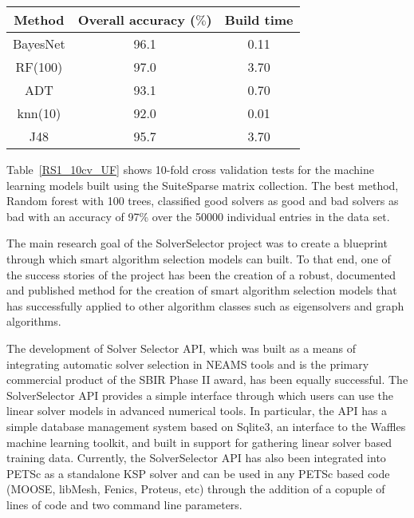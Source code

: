 \begin{table*}[h]
\centering
\caption{Convergence model accuracy and build time for 10-fold cross validation with SuiteSparse data set.}
\label{RS1_10cv_UF}
\begin{tabular}{|c|c|c|}    \hline  

Method                & Overall accuracy ($\%$)  & Build time \\ \hline\hline
BayesNet              &	96.1                    & 0.11	\\ \hline	    
RF(100)   &           97.0                    & 3.70	\\ \hline      
ADT                              &  93.1	                & 0.70	\\ \hline  
knn(10)                             &	92.0                    & 0.01	\\ \hline	    
J48                           &	95.7                    & 3.70	\\ \hline 	    
\end{tabular}
\end{table*}

Table~\ref{RS1_10cv_UF} shows 10-fold cross validation tests for the machine learning models built using the SuiteSparse matrix collection. The best method, Random forest with 100 trees, classified good solvers as good and bad solvers as bad with an accuracy of 97\% over the 50000 individual entries in the data set.

The main research goal of the SolverSelector project was to create a blueprint through which smart algorithm selection models can built. To that end, one of the success stories of the project has been the creation of a robust, documented and published method for the creation of smart algorithm selection models that has successfully applied to other algorithm classes such as eigensolvers and graph algorithms.   

The development of Solver Selector API, which was built as a means of integrating automatic solver selection in NEAMS tools and is the primary commercial product of the SBIR Phase II award, has been equally successful. The SolverSelector API provides a simple interface through which users can use the linear solver models in advanced numerical tools. In particular, the API has a simple database management system based on Sqlite3, an interface to the Waffles machine learning toolkit, and built in support for gathering linear solver based training data. Currently, the SolverSelector API has also been integrated into PETSc as a standalone KSP solver and can be used in any PETSc based code (MOOSE, libMesh, Fenics, Proteus, etc) through the addition of a copuple of lines of code and two command line parameters.

